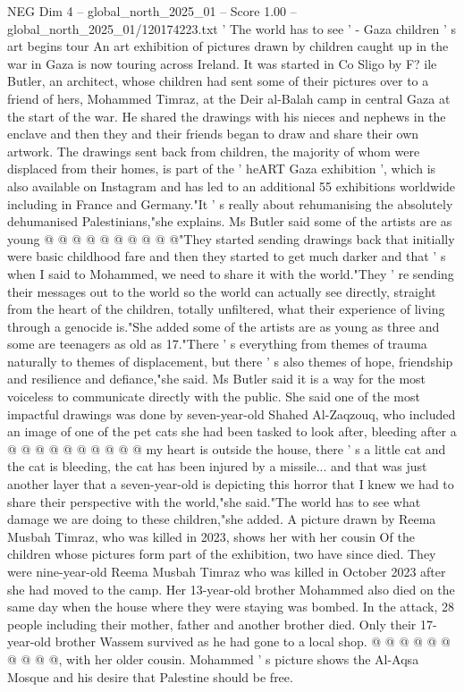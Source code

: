\begin{textsample}{NEG Dim 4 – global\_north\_2025\_01 – Score 1.00 – global\_north\_2025\_01/120174223.txt}  \label{ex:f4_neg_419}
' The world has to see ' - Gaza children ' s art begins tour An art exhibition of pictures drawn by children caught up in the war in Gaza is now touring across Ireland.
It was started in Co Sligo by F? ile Butler, an architect, whose children had sent some of their pictures over to a friend of hers, Mohammed Timraz, at the Deir al-Balah camp in central Gaza at the start of the war.
He shared the drawings with his nieces and nephews in the enclave and then they and their friends began to draw and share their own artwork.
The drawings sent back from children, the majority of whom were displaced from their homes, is part of the ' heART Gaza exhibition ', which is also available on Instagram and has led to an additional 55 exhibitions worldwide including in France and Germany."It ' s really about rehumanising the absolutely dehumanised Palestinians,"she explains.
Ms Butler said some of the artists are as young @ @ @ @ @ @ @ @ @ @"They started sending drawings back that initially were basic childhood fare and then they started to get much darker and that ' s when I said to Mohammed, we need to share it with the world."They ' re sending their messages out to the world so the world can actually see directly, straight from the heart of the children, totally unfiltered, what their experience of living through a genocide is."She added some of the artists are as young as three and some are teenagers as old as 17."There ' s everything from themes of trauma naturally to themes of displacement, but there ' s also themes of hope, friendship and resilience and defiance,"she said.
Ms Butler said it is a way for the most voiceless to communicate directly with the public.
She said one of the most impactful drawings was done by seven-year-old Shahed Al-Zaqzouq, who included an image of one of the pet cats she had been tasked to look after, bleeding after a @ @ @ @ @ @ @ @ @ @ my heart is outside the house, there ' s a little cat and the cat is bleeding, the cat has been injured by a missile... and that was just another layer that a seven-year-old is depicting this horror that I knew we had to share their perspective with the world,"she said."The world has to see what damage we are doing to these children,"she added.
A picture drawn by Reema Musbah Timraz, who was killed in 2023, shows her with her cousin Of the children whose pictures form part of the exhibition, two have since died.
They were nine-year-old Reema Musbah Timraz who was killed in October 2023 after she had moved to the camp.
Her 13-year-old brother Mohammed also died on the same day when the house where they were staying was bombed.
In the attack, 28 people including their mother, father and another brother died.
Only their 17-year-old brother Wassem survived as he had gone to a local shop. @ @ @ @ @ @ @ @ @ @, with her older cousin.
Mohammed ' s picture shows the Al-Aqsa Mosque and his desire that Palestine should be free.

\end{textsample}
